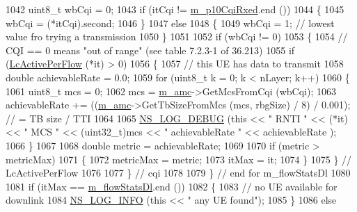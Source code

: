 \begin{DoxyCode}
1042      uint8\_t wbCqi = 0;
1043      \textcolor{keywordflow}{if} (itCqi != \hyperlink{classns3_1_1TdMtFfMacScheduler_a4b524ffee6b93f0534a603937fd30cb1}{m\_p10CqiRxed}.end ())
1044        \{
1045          wbCqi = (*itCqi).second;
1046        \}
1047      \textcolor{keywordflow}{else}
1048        \{
1049          wbCqi = 1; \textcolor{comment}{// lowest value fro trying a transmission}
1050        \}
1051      
1052      \textcolor{keywordflow}{if} (wbCqi != 0)
1053        \{
1054           \textcolor{comment}{// CQI == 0 means "out of range" (see table 7.2.3-1 of 36.213)}
1055           \textcolor{keywordflow}{if} (\hyperlink{classns3_1_1TdMtFfMacScheduler_a50717a0cb48dabadc5c373b9eb1cc8ba}{LcActivePerFlow} (*it) > 0)
1056             \{
1057               \textcolor{comment}{// this UE has data to transmit}
1058               \textcolor{keywordtype}{double} achievableRate = 0.0;
1059               \textcolor{keywordflow}{for} (uint8\_t k = 0; k < nLayer; k++) 
1060                 \{
1061                   uint8\_t mcs = 0; 
1062                   mcs = \hyperlink{classns3_1_1TdMtFfMacScheduler_a2fa1c7abd867e10a52fcd0de82dc6cc1}{m\_amc}->GetMcsFromCqi (wbCqi);
1063                   achievableRate += ((\hyperlink{classns3_1_1TdMtFfMacScheduler_a2fa1c7abd867e10a52fcd0de82dc6cc1}{m\_amc}->GetTbSizeFromMcs (mcs, rbgSize) / 8) / 0.001); \textcolor{comment}{// = TB
       size / TTI}
1064 
1065                   \hyperlink{group__logging_ga413f1886406d49f59a6a0a89b77b4d0a}{NS\_LOG\_DEBUG} (\textcolor{keyword}{this} << \textcolor{stringliteral}{" RNTI "} << (*it) << \textcolor{stringliteral}{" MCS "} << (uint32\_t)mcs << \textcolor{stringliteral}{"
       achievableRate "} << achievableRate );
1066                 \}
1067 
1068              \textcolor{keywordtype}{double} metric = achievableRate;
1069 
1070              \textcolor{keywordflow}{if} (metric > metricMax)
1071                \{
1072                  metricMax = metric;
1073                  itMax = it;
1074                \}
1075            \} \textcolor{comment}{// LcActivePerFlow}
1076 
1077        \} \textcolor{comment}{// cqi}
1078 
1079     \} \textcolor{comment}{// end for m\_flowStatsDl}
1080 
1081   \textcolor{keywordflow}{if} (itMax == \hyperlink{classns3_1_1TdMtFfMacScheduler_abec4dc7fc4bc238696409e0878147dfb}{m\_flowStatsDl}.end ())
1082     \{
1083       \textcolor{comment}{// no UE available for downlink }
1084       \hyperlink{group__logging_gafbd73ee2cf9f26b319f49086d8e860fb}{NS\_LOG\_INFO} (\textcolor{keyword}{this} << \textcolor{stringliteral}{" any UE found"});
1085     \}
1086   \textcolor{keywordflow}{else}

\end{DoxyCode}
